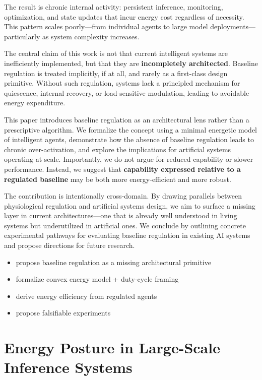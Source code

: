 \documentclass[11pt]{article}
\begin{document}
The result is chronic internal activity: persistent inference, monitoring, optimization, and state updates that incur energy cost regardless of necessity. This pattern scales poorly---from individual agents to large model deployments---particularly as system complexity increases.

The central claim of this work is not that current intelligent systems are inefficiently implemented, but that they are \textbf{incompletely architected}. Baseline regulation is treated implicitly, if at all, and rarely as a first-class design primitive. Without such regulation, systems lack a principled mechanism for quiescence, internal recovery, or load-sensitive modulation, leading to avoidable energy expenditure.

This paper introduces baseline regulation as an architectural lens rather than a prescriptive algorithm. We formalize the concept using a minimal energetic model of intelligent agents, demonstrate how the absence of baseline regulation leads to chronic over-activation, and explore the implications for artificial systems operating at scale. Importantly, we do not argue for reduced capability or slower performance. Instead, we suggest that \textbf{capability expressed relative to a regulated baseline} may be both more energy-efficient and more robust.

The contribution is intentionally cross-domain. By drawing parallels between physiological regulation and artificial systems design, we aim to surface a missing layer in current architectures---one that is already well understood in living systems but underutilized in artificial ones. We conclude by outlining concrete experimental pathways for evaluating baseline regulation in existing AI systems and propose directions for future research.

\begin{itemize}
\item propose baseline regulation as a missing architectural primitive
\item formalize convex energy model + duty-cycle framing
\item derive energy efficiency from regulated agents
\item propose falsifiable experiments
\end{itemize}

\section{Energy Posture in Large-Scale Inference Systems}
\end{document}
